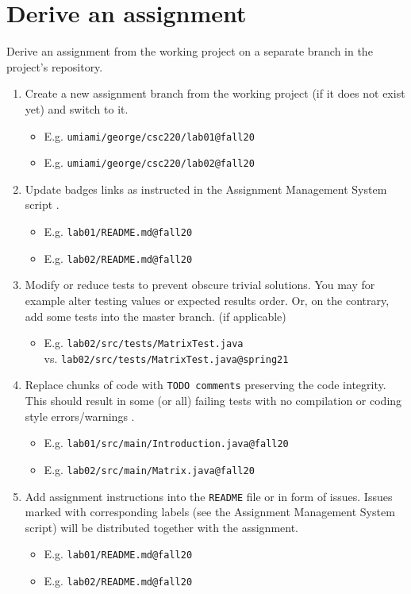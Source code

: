 \section{Derive an assignment} \label{ssec:deriveassn}

{Derive an assignment from the working project on a separate branch in the project’s repository.}

\begin{enumerate}
\item
 {Create a new assignment branch from the working project (if it does not exist yet) and switch to it.}
    \begin{itemize}
    \item
      {E.g. \texttt{umiami/george/csc220/lab01@fall20}}
    \item
      {E.g. \texttt{umiami/george/csc220/lab02@fall20}}
    \end{itemize}

\item
  {Update badges links as instructed in the Assignment Management System script .}
    \begin{itemize}
    \item
      {E.g. \texttt{lab01/README.md@fall20}}
    \item
      {E.g. \texttt{lab02/README.md@fall20}}
    \end{itemize}

\item
  {Modify or reduce tests to prevent obscure trivial solutions. You may for example alter testing values or expected results order. Or, on the contrary, add some tests into the master branch. (if applicable)}
    \begin{itemize}
    \item
      {E.g. \texttt{lab02/src/tests/MatrixTest.java} \\ vs. \texttt{lab02/src/tests/MatrixTest.java@spring21}}
    \end{itemize}

\item
  {Replace chunks of code with \texttt{TODO comments} preserving the code integrity. This should result in some (or all) failing tests with no compilation or coding style errors/warnings .}
    \begin{itemize}
    \item
      {E.g. \texttt{lab01/src/main/Introduction.java@fall20}}
    \item
      {E.g. \texttt{lab02/src/main/Matrix.java@fall20}}
    \end{itemize}

\item
  {Add assignment instructions into the \texttt{README} file or in form of issues. Issues marked with corresponding labels (see the Assignment Management System script) will be distributed together with the assignment.}
    \begin{itemize}
    \item
      {E.g. \texttt{lab01/README.md@fall20}}
    \item
      {E.g. \texttt{lab02/README.md@fall20}}
    \end{itemize}
\end{enumerate}

